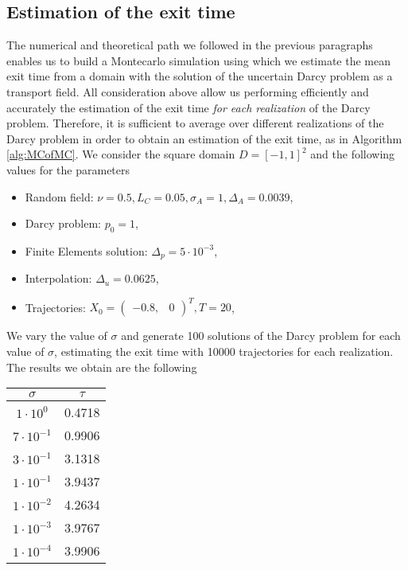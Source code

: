 \subsection{Estimation of the exit time}

The numerical and theoretical path we followed in the previous paragraphs enables us to build a Montecarlo simulation using which we estimate the mean exit time from a domain with the solution of the uncertain Darcy problem as a transport field. All consideration above allow us performing efficiently and accurately the estimation of the exit time \textit{for each realization} of the Darcy problem. Therefore, it is sufficient to average over different realizations of the Darcy problem in order to obtain an estimation of the exit time, as in Algorithm \ref{alg:MCofMC}. We consider the square domain $D = [-1, 1]^2$ and the following values for the parameters
\begin{itemize}
	\item Random field: $\nu = 0.5, L_C = 0.05, \sigma_A = 1, \Delta_A = 0.0039$,
	\item Darcy problem: $p_0 = 1$,
	\item Finite Elements solution: $\Delta_p = 5\cdot 10^{-3}$,
	\item Interpolation: $\Delta_u = 0.0625$,
	\item Trajectories: $X_0 = \begin{pmatrix} -0.8, & 0 \end{pmatrix}^T,  T = 20$,
\end{itemize}

\noindent We vary the value of $\sigma$ and generate 100 solutions of the Darcy problem for each value of $\sigma$, estimating the exit time with 10000 trajectories for each realization. The results we obtain are the following 

\begin{center}
 	\begin{tabular}{|c c|} 
 	\hline
 	$\sigma$ & $\tau$ \\ [0.5ex] 
 	\hline\hline
	$1\cdot10^0$ & 0.4718 \\ 
 	\hline
	$7\cdot10^{-1}$ & 0.9906 \\
	\hline
	$3\cdot10^{-1}$ & 3.1318 \\
	\hline
 	$1\cdot10^{-1}$ & 3.9437 \\
 	\hline
 	$1\cdot10^{-2}$ & 4.2634 \\
 	\hline
	$1\cdot10^{-3}$ & 3.9767 \\
	\hline
	$1\cdot10^{-4}$ & 3.9906 \\
	\hline
\end{tabular}
\end{center}

